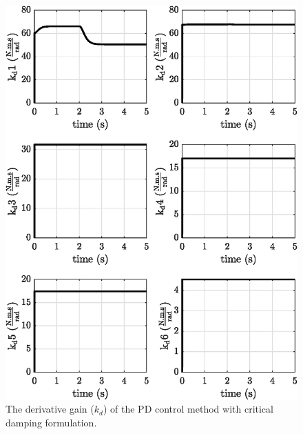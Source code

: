 \begin{figure}[H]
    \centering
    \includegraphics{images/act_1.5_step/kd.eps}
    \caption{The derivative gain ($k_d$) of the PD control method with critical damping formulation.}
    \label{fig:act_1.5_k_d}
\end{figure}



\newpage
